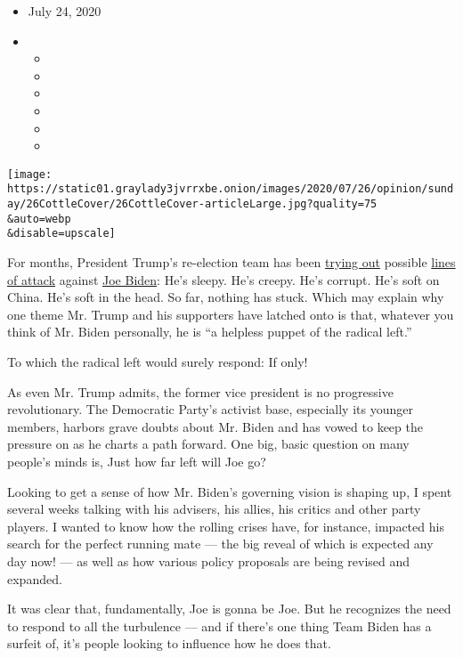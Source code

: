 \begin{itemize}
\item
  July 24, 2020
\item
  \begin{itemize}
  \item
  \item
  \item
  \item
  \item
  \item
  \end{itemize}
\end{itemize}

\texttt{[image: https://static01.graylady3jvrrxbe.onion/images/2020/07/26/opinion/sunday/26CottleCover/26CottleCover-articleLarge.jpg?quality=75\\\&auto=webp\\\&disable=upscale]}

For months, President Trump's re-election team has been
\href{https://apnews.com/698d634366a78b7197a14784605c76a8}{trying out}
possible
\href{https://www.theatlantic.com/ideas/archive/2020/06/trump-cant-figure-out-how-attack-biden/613402/}{lines
of attack} against
\href{https://www.nytimes3xbfgragh.onion/2020/07/24/business/joe-biden-stocks-taxes.html}{Joe
Biden}: He's sleepy. He's creepy. He's corrupt. He's soft on China. He's
soft in the head. So far, nothing has stuck. Which may explain why one
theme Mr. Trump and his supporters have latched onto is that, whatever
you think of Mr. Biden personally, he is ``a helpless puppet of the
radical left.''

To which the radical left would surely respond: If only!

As even Mr. Trump admits, the former vice president is no progressive
revolutionary. The Democratic Party's activist base, especially its
younger members, harbors grave doubts about Mr. Biden and has vowed to
keep the pressure on as he charts a path forward. One big, basic
question on many people's minds is, Just how far left will Joe go?

Looking to get a sense of how Mr. Biden's governing vision is shaping
up, I spent several weeks talking with his advisers, his allies, his
critics and other party players. I wanted to know how the rolling crises
have, for instance, impacted his search for the perfect running mate ---
the big reveal of which is expected any day now! --- as well as how
various policy proposals are being revised and expanded.

It was clear that, fundamentally, Joe is gonna be Joe. But he recognizes
the need to respond to all the turbulence --- and if there's one thing
Team Biden has a surfeit of, it's people looking to influence how he
does that.

